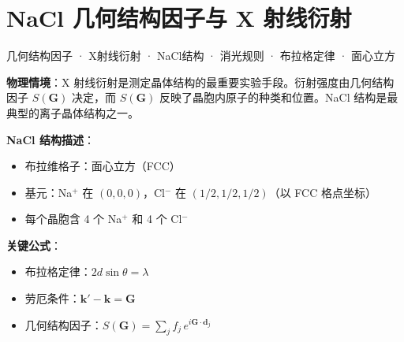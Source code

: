 
\section{NaCl 几何结构因子与 X 射线衍射}
\label{sec:xray-nacl}

\begin{tipbox}[关键词标签]
几何结构因子 · X射线衍射 · NaCl结构 · 消光规则 · 布拉格定律 · 面心立方
\end{tipbox}

\begin{modelbox}
\textbf{物理情境}：X 射线衍射是测定晶体结构的最重要实验手段。衍射强度由几何结构因子 $S(\mathbf{G})$ 决定，而 $S(\mathbf{G})$ 反映了晶胞内原子的种类和位置。NaCl 结构是最典型的离子晶体结构之一。

\textbf{NaCl 结构描述}：
\begin{itemize}[nosep]
    \item 布拉维格子：面心立方（FCC）
    \item 基元：Na$^+$ 在 $(0,0,0)$，Cl$^-$ 在 $(1/2,1/2,1/2)$（以 FCC 格点坐标）
    \item 每个晶胞含 4 个 Na$^+$ 和 4 个 Cl$^-$
\end{itemize}

\textbf{关键公式}：
\begin{itemize}[nosep]
    \item 布拉格定律：$2d\sin\theta=\lambda$
    \item 劳厄条件：$\mathbf{k}'-\mathbf{k}=\mathbf{G}$
    \item 几何结构因子：$S(\mathbf{G})=\sum_j f_j\,e^{i\mathbf{G}\cdot\mathbf{d}_j}$
\end{itemize}
\end{modelbox}

